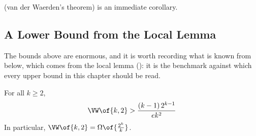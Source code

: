  (van der Waerden's theorem) is an immediate corollary.

\subsection{A Lower Bound from the Local Lemma}

The bounds above are enormous, and it is worth recording what is known from below, which comes from the \Lovasz{} local lemma (): it is the benchmark against which every upper bound in this chapter should be read.

\begin{boxproposition} \label{Ch6:Prop:VW_Lower_Bound}
    For all $k \geq 2$,
    \begin{align*}
        \VW\of{k, 2} > \frac{(k - 1) \, 2^{k - 1}}{e k^2}
    \end{align*}
    In particular, $\VW\of{k, 2} = \Omega\of{\frac{2^k}{k}}$.
\end{boxproposition}
